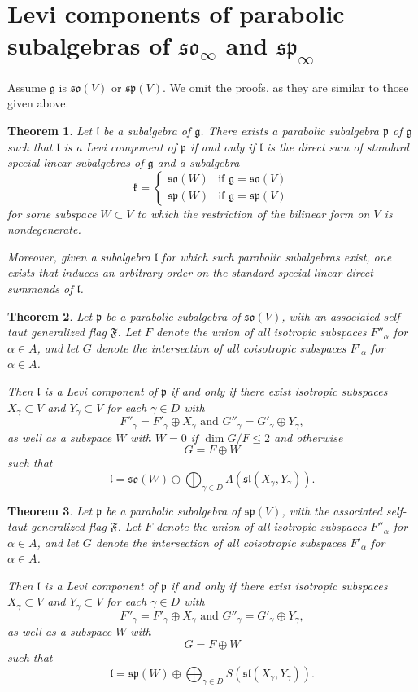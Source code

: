 \documentclass{amsart}
\newtheorem{theorem}{Theorem}[section]
\theoremstyle{definition}
\theoremstyle{remark}
\numberwithin{equation}{section}
\def\g{\mathfrak {g}}
\def\l{\mathfrak {l}}
\def\p{\mathfrak {p}}
\def\sl{\mathfrak{sl}}
\def\so{\mathfrak{so}}
\def\sp{\mathfrak{sp}}
\def\k{\mathfrak{k}}
\def\F{\mathfrak{F}}
\begin{document}
\section{Levi components of parabolic subalgebras of $\so_\infty$ and $\sp_\infty$}


Assume $\g$ is $\so(V)$ or $\sp(V)$.  We omit the proofs, as they are similar to those given above.



\begin{theorem}
Let $\l$ be a subalgebra of $\g$.  There exists a parabolic subalgebra $\p$ of $\g$ such that $\l$ is a Levi component of $\p$ if and only if $\l$ is the direct sum of standard special linear subalgebras of $\g$ and a subalgebra 
$$\k =
\begin{cases}
\so(W) & \textrm{if } \g = \so(V) \\
\sp(W)  & \textrm{if } \g = \sp(V)
\end{cases}$$
for some subspace $W \subset V$ to which the restriction of the bilinear form on $V$ is nondegenerate.

Moreover, given a subalgebra $\l$ for which such parabolic subalgebras exist, one exists that induces an arbitrary order on the standard special linear direct summands of $\l$.
\end{theorem}


\begin{theorem} \label{iffso}
Let $\p$ be a parabolic subalgebra of $\so(V)$, with an associated self-taut generalized flag $\F$.  Let $F$ denote the union of all isotropic subspaces $F''_\alpha$ for $\alpha \in A$, and let $G$ denote the intersection of all coisotropic subspaces $F'_\alpha$ for $\alpha \in A$.

Then $\l$ is a Levi component of $\p$ if and only if 
there exist isotropic subspaces $X_\gamma \subset V$ and $Y_\gamma \subset V$ for each $\gamma \in D$ with
$$F''_\gamma = F'_\gamma \oplus X_\gamma \textrm{ and } G''_\gamma = G'_\gamma \oplus Y_\gamma,$$ 
 as well as a subspace $W$ with
$W=0$ if $\dim G / F \leq 2$ and otherwise
$$G = F \oplus W$$
such that
$$\l = \so(W) \oplus \bigoplus_{\gamma \in D} \Lambda(\sl(X_\gamma, Y_\gamma)).$$
\end{theorem}


\begin{theorem} \label{iffsp}
Let $\p$ be a parabolic subalgebra of $\sp(V)$, with the associated self-taut generalized flag $\F$.  Let $F$ denote the union of all isotropic subspaces $F''_\alpha$ for $\alpha \in A$, and let $G$ denote the intersection of all coisotropic subspaces $F'_\alpha$ for $\alpha \in A$.

Then $\l$ is a Levi component of $\p$ if and only if 
there exist isotropic subspaces $X_\gamma \subset V$ and $Y_\gamma \subset V$ for each $\gamma \in D$ with
$$F''_\gamma = F'_\gamma \oplus X_\gamma \textrm{ and } G''_\gamma = G'_\gamma \oplus Y_\gamma,$$ 
as well as a subspace $W$ with 
$$G = F \oplus W$$
such that
$$\l = \sp(W) \oplus \bigoplus_{\gamma \in D} S(\sl(X_\gamma, Y_\gamma)).$$
\end{theorem}
\end{document}
